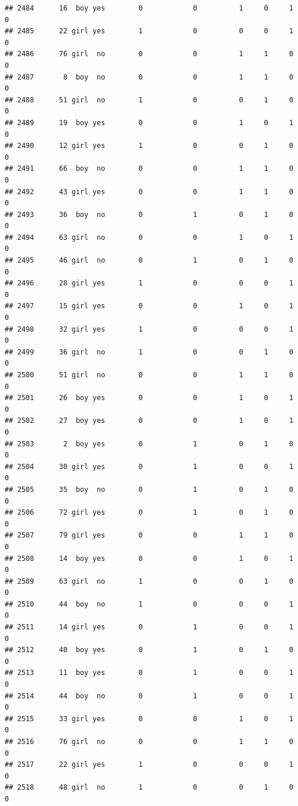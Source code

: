 \documentclass[man]{apa6}
\begin{document}
\begin{verbatim}
## 2484      16  boy yes        0            0          1     0     1     0
## 2485      22 girl yes        1            0          0     0     1     0
## 2486      76 girl  no        0            0          1     1     0     0
## 2487       8  boy  no        0            0          1     1     0     0
## 2488      51 girl  no        1            0          0     1     0     0
## 2489      19  boy yes        0            0          1     0     1     0
## 2490      12 girl yes        1            0          0     1     0     0
## 2491      66  boy  no        0            0          1     1     0     0
## 2492      43 girl yes        0            0          1     1     0     0
## 2493      36  boy  no        0            1          0     1     0     0
## 2494      63 girl  no        0            0          1     0     1     0
## 2495      46 girl  no        0            1          0     1     0     0
## 2496      28 girl yes        1            0          0     0     1     0
## 2497      15 girl yes        0            0          1     0     1     0
## 2498      32 girl yes        1            0          0     0     1     0
## 2499      36 girl  no        1            0          0     1     0     0
## 2500      51 girl  no        0            0          1     1     0     0
## 2501      26  boy yes        0            0          1     0     1     0
## 2502      27  boy yes        0            0          1     0     1     0
## 2503       2  boy yes        0            1          0     1     0     0
## 2504      30 girl yes        0            1          0     0     1     0
## 2505      35  boy  no        0            1          0     1     0     0
## 2506      72 girl yes        0            1          0     1     0     0
## 2507      79 girl yes        0            0          1     1     0     0
## 2508      14  boy yes        0            0          1     0     1     0
## 2509      63 girl  no        1            0          0     1     0     0
## 2510      44  boy  no        1            0          0     0     1     0
## 2511      14 girl yes        0            1          0     0     1     0
## 2512      40  boy yes        0            1          0     1     0     0
## 2513      11  boy yes        0            1          0     0     1     0
## 2514      44  boy  no        0            1          0     0     1     0
## 2515      33 girl yes        0            0          1     0     1     0
## 2516      76 girl  no        0            0          1     1     0     0
## 2517      22 girl yes        1            0          0     0     1     0
## 2518      48 girl  no        1            0          0     1     0     0

\end{verbatim}
\end{document}
